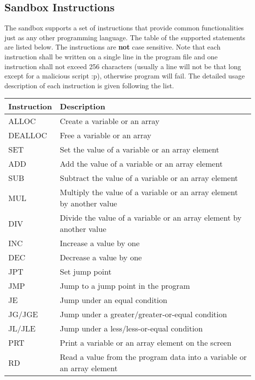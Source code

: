 \documentclass[11pt]{article}
\begin{document}
\subsection{Sandbox Instructions}
The sandbox supports a set of instructions that provide common functionalities just as any other programming language. The table of the supported statements are listed below. The instructions are {\bf not} case sensitive. Note that each instruction shall be written on a single line in the program file and one instruction shall not exceed 256 characters (usually a line will not be that long except for a malicious script :p), otherwise program will fail. The detailed usage description of each instruction is given following the list.

\begin{center}
  \begin{tabular}{| l | p{10cm} | }
    \hline
Instruction & Description \\ \hline
ALLOC &  Create a variable or an array\\ \hline 
DEALLOC & Free a variable or an array\\ \hline
SET & Set the value of a variable or an array element\\ \hline
ADD & Add the value of a variable or an array element\\ \hline
SUB & Subtract the value of a variable or an array element\\ \hline
MUL & Multiply the value of a variable or an array element by another value\\ \hline
DIV & Divide the value of a variable or an array element by another value\\ \hline
INC & Increase a value by one\\ \hline
DEC & Decrease a value by one\\ \hline
JPT  & Set jump point\\ \hline
JMP & Jump to a jump point in the program\\ \hline
JE  & Jump under an equal condition\\ \hline
JG/JGE   & Jump under a greater/greater-or-equal condition\\ \hline
JL/JLE    & Jump under a less/less-or-equal condition\\ \hline
PRT & Print a variable or an array element on the screen\\ \hline
RD & Read a value from the program data into a variable or an array element\\ \hline
  \end{tabular}
\end{center}
\end{document}
